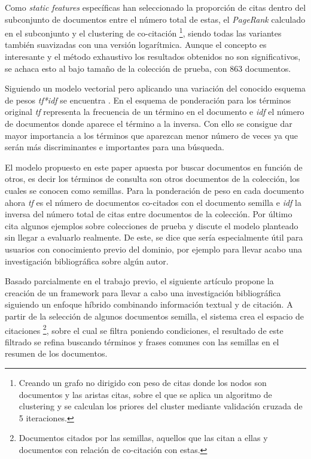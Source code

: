 Como \textit{static features} específicas han seleccionado la proporción de citas dentro del subconjunto de documentos entre el número total de estas, el \textit{PageRank} calculado en el subconjunto y el clustering de co-citación \footnote{Creando un grafo no dirigido con peso de citas donde los nodos son documentos y las aristas citas, sobre el que se aplica un algoritmo de clustering y se calculan los priores del cluster mediante validación cruzada de 5 iteraciones.}, siendo todas las variantes también suavizadas con una versión logarítmica. Aunque el concepto es interesante y el método exhaustivo los resultados obtenidos no son significativos, se achaca esto al bajo tamaño de la colección de prueba, con 863 documentos.

Siguiendo un modelo vectorial pero aplicando una variación del conocido esquema de pesos \textit{tf*idf} se encuentra \cite{DBLP:conf/ecir/White16}. En el esquema de ponderación para los términos original \textit{tf} representa la frecuencia de un término en el documento e \textit{idf} el número de documentos donde aparece el término a la inversa. Con ello se consigue dar mayor importancia a los términos que aparezcan menor número de veces ya que serán más discriminantes e importantes para una búsqueda.

El modelo propuesto en este paper apuesta por buscar documentos en función de otros, es decir los términos de consulta son otros documentos de la colección, los cuales se conocen como semillas. Para la ponderación de peso en cada documento ahora \textit{tf} es el número de documentos co-citados con el documento semilla e \textit{idf} la inversa del número total de citas entre documentos de la colección. Por último cita algunos ejemplos sobre colecciones de prueba y discute el modelo planteado sin llegar a evaluarlo realmente. De este, se dice que sería especialmente útil para usuarios con conocimiento previo del dominio, por ejemplo para llevar acabo una investigación bibliográfica sobre algún autor.

Basado parcialmente en el trabajo previo, el siguiente artículo \cite{DBLP:conf/ecir/SarolLS18} propone la creación de un \gls{framework}  para llevar a cabo una investigación bibliográfica siguiendo un enfoque híbrido combinando información textual y de citación. A partir de la selección de algunos documentos semilla, el sistema crea el espacio de citaciones \footnote{Documentos citados por las semillas, aquellos que las citan a ellas y documentos con relación de co-citación con estas.}, sobre el cual se filtra poniendo condiciones, el resultado de este filtrado se refina buscando términos y frases comunes con las semillas en el resumen de los documentos. 

